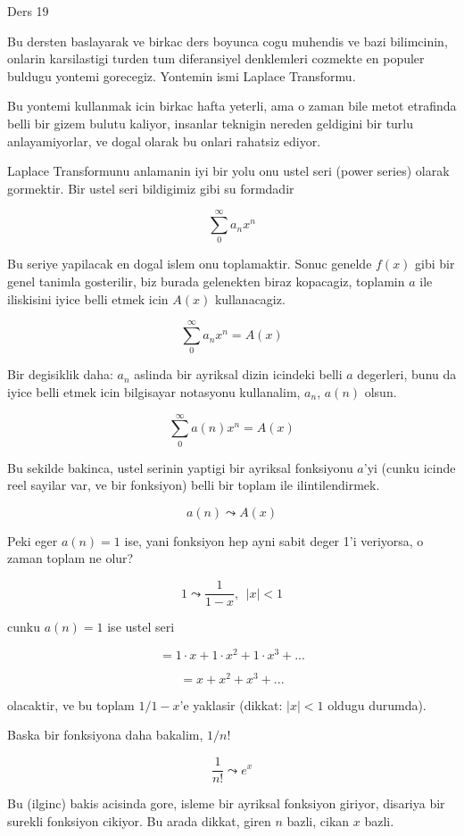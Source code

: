 \documentclass[12pt,fleqn]{article}
\begin{document}
Ders 19 

Bu dersten baslayarak ve birkac ders boyunca cogu muhendis ve bazi
bilimcinin, onlarin karsilastigi turden tum diferansiyel denklemleri
cozmekte en populer buldugu yontemi gorecegiz. Yontemin ismi Laplace
Transformu. 

Bu yontemi kullanmak icin birkac hafta yeterli, ama o zaman bile metot
etrafinda belli bir gizem bulutu kaliyor, insanlar teknigin nereden
geldigini bir turlu anlayamiyorlar, ve dogal olarak bu onlari rahatsiz
ediyor.  

Laplace Transformunu anlamanin iyi bir yolu onu ustel seri (power series)
olarak gormektir. Bir ustel seri bildigimiz gibi su formdadir

\[ \sum_{0}^{\infty} a_n x^n \]

Bu seriye yapilacak en dogal islem onu toplamaktir. Sonuc genelde $f(x)$
gibi bir genel tanimla gosterilir, biz burada gelenekten biraz kopacagiz,
toplamin $a$ ile iliskisini iyice belli etmek icin $A(x)$ kullanacagiz. 

\[ \sum_{0}^{\infty} a_n x^n = A(x)\]

Bir degisiklik daha: $a_n$ aslinda bir ayriksal dizin icindeki belli $a$
degerleri, bunu da iyice belli etmek icin bilgisayar notasyonu kullanalim,
$a_n$, $a(n)$ olsun. 

\[ \sum_{0}^{\infty} a(n) x^n = A(x)\]

Bu sekilde bakinca, ustel serinin yaptigi bir ayriksal fonksiyonu $a$'yi
(cunku icinde reel sayilar var, ve bir fonksiyon) belli bir toplam ile
ilintilendirmek. 

\[ a(n) \leadsto A(x) \]

Peki eger $a(n) = 1$ ise, yani fonksiyon hep ayni sabit deger 1'i
veriyorsa, o zaman toplam ne olur? 

\[ 1 \leadsto \frac{1}{1-x}, \ \ |x|<1 \]

cunku $a(n) = 1$ ise ustel seri 

\[ = 1 \cdot x + 1 \cdot x^2 + 1 \cdot x^3 + ... \]

\[ = x + x^2 + x^3 + ... \]

olacaktir, ve bu toplam $1/1-x$'e yaklasir (dikkat: $|x|<1$ oldugu
durumda). 

Baska bir fonksiyona daha bakalim, $1 / n!$ 

\[ \frac{1}{n!} \leadsto e^x \]

Bu (ilginc) bakis acisinda gore, isleme bir ayriksal fonksiyon giriyor,
disariya bir surekli fonksiyon cikiyor. Bu arada dikkat, giren $n$ bazli, cikan $x$
bazli. 
\end{document}
